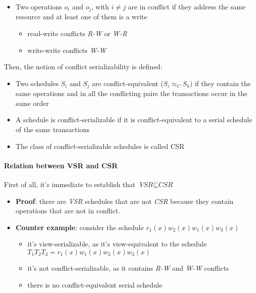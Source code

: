 \documentclass[english]{article}
\begin{document}
\begin{itemize}
  \item Two operations \(o_i\) and \(o_j\), with \(i \neq j\) are in conflict if they address the same resource and at least one of them is a write
        \begin{itemize}
          \item read-write conflicts \textit{R-W} or \textit{W-R}
          \item write-write conflicts \textit{W-W}
        \end{itemize}
\end{itemize}

Then, the notion of conflict serializability is defined:

\begin{itemize}
  \item Two schedules \(S_i\) and \(S_j\)  are conflict-equivalent (\(S_i \approx_C S_k\)) if they contain the same operations and in all the conflicting pairs the transactions occur in the same order
  \item A schedule is conflict-serializable if it is conflict-equivalent to a serial schedule of the same transactions
  \item The class of conflict-serializable schedules is called CSR
\end{itemize}

\paragraph{Relation between VSR and CSR}

First of all, it's immediate to establish that \(\textit{VSR} \subseteq \textit{CSR}\)

\begin{itemize}
  \item \textbf{Proof}: there are \textit{VSR} schedules that are not \textit{CSR} because they contain operations that are not in conflict.
  \item \textbf{Counter example}: consider the schedule \(r_1(x) w_2(x) w_1(x) w_3(x)\)
        \begin{itemize}
          \item it's view-serializable, as it's view-equivalent to the schedule \(T_1 T_2 T_3 = r_1(x) w_1(x) w_2(x) w_3(x)\)
          \item it's not conflict-serializable, as it contains \textit{R-W} and \textit{W-W} conflicts
          \item there is no conflict-equivalent serial schedule
        \end{itemize}
\end{itemize}
\end{document}
